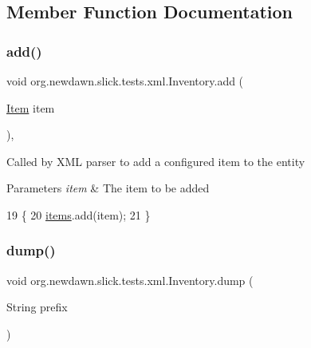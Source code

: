 \subsection{Member Function Documentation}
\mbox{\label{classorg_1_1newdawn_1_1slick_1_1tests_1_1xml_1_1_inventory_a900aaad5d0e18480d365397a8579e3a3}} 
\subsubsection{\texorpdfstring{add()}{add()}}
{\footnotesize\ttfamily void org.\+newdawn.\+slick.\+tests.\+xml.\+Inventory.\+add (\begin{DoxyParamCaption}\item[{\mbox{\hyperlink{classorg_1_1newdawn_1_1slick_1_1tests_1_1xml_1_1_item}{Item}}}]{item }\end{DoxyParamCaption})\hspace{0.3cm}{\ttfamily [inline]}, {\ttfamily [private]}}

Called by X\+ML parser to add a configured item to the entity


\begin{DoxyParams}{Parameters}
{\em item} & The item to be added \\
\hline
\end{DoxyParams}

\begin{DoxyCode}
19                                 \{
20         \mbox{\hyperlink{namespaceitems}{items}}.add(item);
21     \}
\end{DoxyCode}
\mbox{\label{classorg_1_1newdawn_1_1slick_1_1tests_1_1xml_1_1_inventory_ae6476f32141f6791d3b69cc9687fae4a}} 
\subsubsection{\texorpdfstring{dump()}{dump()}}
{\footnotesize\ttfamily void org.\+newdawn.\+slick.\+tests.\+xml.\+Inventory.\+dump (\begin{DoxyParamCaption}\item[{String}]{prefix }\end{DoxyParamCaption})\hspace{0.3cm}{\ttfamily [inline]}}

